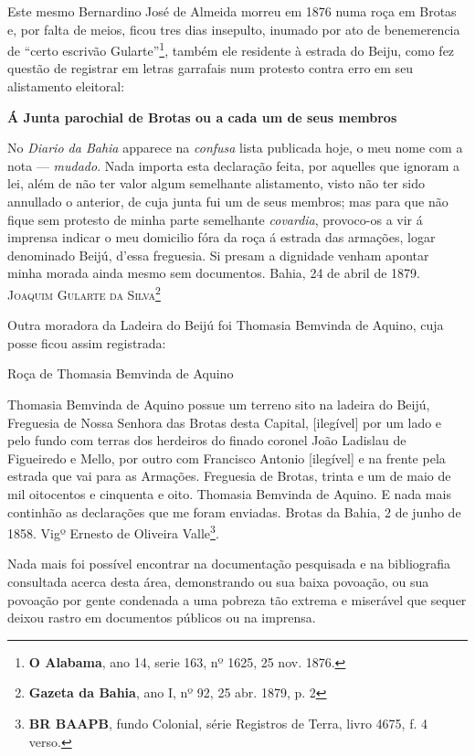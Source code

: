 Este mesmo Bernardino José de Almeida morreu em 1876 numa roça em Brotas e, por falta de meios, ficou tres dias insepulto, inumado por ato de benemerencia de ``certo escrivão Gularte''\footnote{\textbf{O Alabama}, ano 14, serie 163, nº 1625, 25 nov. 1876.}, também ele residente à estrada do Beiju, como fez questão de registrar em letras garrafais num protesto contra erro em seu alistamento eleitoral:

\begin{citacao}
\textbf{Á Junta parochial de Brotas ou a cada um de seus membros}

No \textit{Diario da Bahia} apparece na \textit{confusa} lista publicada hoje, o meu nome com a nota --- \textit{mudado}.
Nada importa esta declaração feita, por aquelles que ignoram a lei, além de não ter valor algum semelhante alistamento, visto não ter sido annullado o anterior, de cuja junta fui um de seus membros; mas para que não fique sem protesto de minha parte semelhante \textit{covardia}, provoco-os a vir á imprensa indicar o meu domicilio fóra da roça á estrada das armações, logar denominado Beijú, d'essa freguesia.
Si presam a dignidade venham apontar minha morada ainda mesmo sem documentos.
Bahia, 24 de abril de 1879.
\textsc{Joaquim Gularte da Silva}\footnote{\textbf{Gazeta da Bahia}, ano I, nº 92, 25 abr. 1879, p. 2}
\end{citacao}

Outra moradora da Ladeira do Beijú foi Thomasia Bemvinda de Aquino, cuja posse ficou assim registrada:

\begin{citacao}
Roça de Thomasia Bemvinda de Aquino

Thomasia Bemvinda de Aquino possue um terreno sito na ladeira do Beijú, Freguesia de Nossa Senhora das Brotas desta Capital, [ilegível] por um lado e pelo fundo com terras dos herdeiros do finado coronel João Ladislau de Figueiredo e Mello, por outro com Francisco Antonio [ilegível] e na frente pela estrada que vai para as Armações. Freguesia de Brotas, trinta e um de maio de mil oitocentos e cinquenta e oito. Thomasia Bemvinda de Aquino. E nada mais continhão as declarações que me foram enviadas. Brotas da Bahia, 2 de junho de 1858. Vigº Ernesto de Oliveira Valle\footnote{\textbf{BR BAAPB}, fundo Colonial, série Registros de Terra, livro 4675, f. 4 verso.}. 
\end{citacao}

Nada mais foi possível encontrar na documentação pesquisada e na bibliografia consultada acerca desta área, demonstrando ou sua baixa povoação, ou sua povoação por gente condenada a uma pobreza tão extrema e miserável que sequer deixou rastro em documentos públicos ou na imprensa.


